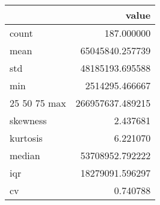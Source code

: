 \begin{tabular}{lr}
\toprule
 & value \\
\midrule
count & 187.000000 \\
mean & 65045840.257739 \\
std & 48185193.695588 \\
min & 2514295.466667 \\
25%
50%
75%
max & 266957637.489215 \\
skewness & 2.437681 \\
kurtosis & 6.221070 \\
median & 53708952.792222 \\
iqr & 18279091.596297 \\
cv & 0.740788 \\
\bottomrule
\end{tabular}
